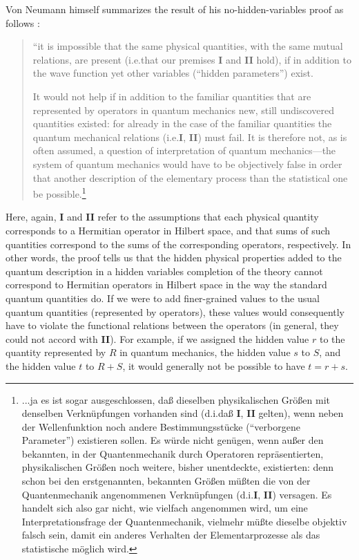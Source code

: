 \documentclass[12pt]{article}
\begin{document}
Von Neumann himself summarizes the result of his no-hidden-variables proof as follows \cite[p.\@ 171]{VN1}:
\begin{quote}
 ``it is impossible that the same physical quantities, with the same mutual relations, are present (i.e.\@ that our premises \textbf{I} and \textbf{II} hold), if in addition to the wave function yet other variables (``hidden parameters'') exist.

 It would not help if in addition to the familiar quantities that are represented by operators in quantum mechanics new, still undiscovered quantities existed: for already in the case of the familiar quantities the quantum mechanical relations (i.e.\@ \textbf{I}, \textbf{II}) must fail. It is therefore not, as is often assumed, a question of interpretation of quantum mechanics---the system of quantum mechanics would have to be objectively false in order that another description of the elementary process than the statistical one be possible.\footnote{...ja es ist sogar ausgeschlossen, da{\ss} dieselben physikalischen Gr\"{o}{\ss}en mit denselben Verkn\"{u}pfungen vorhanden sind (d.i.\@ da{\ss} \textbf{I}, \textbf{II} gelten), wenn neben der Wellenfunktion noch andere Bestimmungsst\"{u}cke (``verborgene Parameter'') existieren sollen. Es w\"{u}rde nicht gen\"{u}gen, wenn au{\ss}er den bekannten, in der Quantenmechanik durch Operatoren repr\"{a}sentierten, physikalischen Gr\"{o}{\ss}en noch weitere, bisher unentdeckte, existierten: denn schon bei den erstgenannten, bekannten Gr\"{o}{\ss}en m\"{u}{\ss}ten die von der Quantenmechanik angenommenen Verkn\"{u}pfungen (d.i.\@ \textbf{I}, \textbf{II}) versagen. Es handelt sich also gar nicht, wie vielfach angenommen wird, um eine Interpretationsfrage der Quantenmechanik, vielmehr m\"{u}{\ss}te dieselbe objektiv falsch sein, damit ein anderes Verhalten der Elementarprozesse als das statistische m\"{o}glich wird.}
\end{quote}
Here, again, \textbf{I} and \textbf{II} refer to the assumptions that each physical quantity corresponds to a Hermitian operator in Hilbert space, and that sums of such quantities correspond to the sums of the corresponding operators, respectively. In other words, the proof tells us that the hidden physical properties added to the quantum description in a hidden variables completion of the theory cannot correspond to Hermitian operators in Hilbert space in the way the standard quantum quantities do. If we were to add finer-grained values to the usual quantum quantities (represented by operators), these values would consequently have to violate the functional relations between the operators (in general, they could not accord with \textbf{II}). For example, if we assigned the hidden value $r$ to the quantity represented by $R$ in quantum mechanics, the hidden value $s$ to $S$, and the hidden value $t$ to $R + S$, it would generally not be possible to have $t = r + s$.
\end{document}
